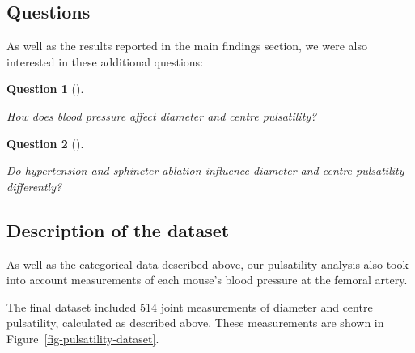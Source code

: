 \documentclass[
  letterpaper,
  DIV=11,
  numbers=noendperiod,
  oneside]{scrartcl}
\theoremstyle{plain}
\newtheorem{theorem}{Question}[section]
\theoremstyle{remark}
\begin{document}
\subsection{Questions}\label{questions}

As well as the results reported in the main findings section, we were
also interested in these additional questions:

\begin{theorem}[]\protect\hypertarget{thm-qc}{}\label{thm-qc}

How does blood pressure affect diameter and centre pulsatility?

\end{theorem}

\begin{theorem}[]\protect\hypertarget{thm-qd}{}\label{thm-qd}

Do hypertension and sphincter ablation influence diameter and centre
pulsatility differently?

\end{theorem}

\subsection{Description of the
dataset}\label{description-of-the-dataset}

As well as the categorical data described above, our pulsatility
analysis also took into account measurements of each mouse's blood
pressure at the femoral artery.

The final dataset included 514 joint measurements of diameter and centre
pulsatility, calculated as described above. These measurements are shown
in Figure~\ref{fig-pulsatility-dataset}.
\end{document}
